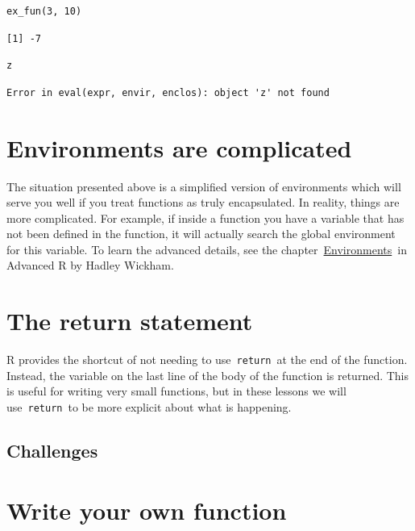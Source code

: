 \documentclass[
]{book}
\begin{document}
\begin{verbatim}
ex_fun(3, 10)
\end{verbatim}

\begin{verbatim}
[1] -7
\end{verbatim}

\begin{verbatim}
z
\end{verbatim}

\begin{verbatim}
Error in eval(expr, envir, enclos): object 'z' not found
\end{verbatim}

\hypertarget{environments-are-complicated}{%
\section{Environments are complicated}\label{environments-are-complicated}}

The situation presented above is a simplified version of environments which will serve you well if you treat functions as truly encapsulated. In reality, things are more complicated. For example, if inside a function you have a variable that has not been defined in the function, it will actually search the global environment for this variable. To learn the advanced details, see the chapter~\href{http://adv-r.had.co.nz/Environments.html}{Environments}~in Advanced R by Hadley Wickham.

\hypertarget{the-return-statement}{%
\section{The return statement}\label{the-return-statement}}

R provides the shortcut of not needing to use~\texttt{return}~at the end of the function. Instead, the variable on the last line of the body of the function is returned. This is useful for writing very small functions, but in these lessons we will use~\texttt{return}~to be more explicit about what is happening.

\hypertarget{challenges}{%
\subsection{Challenges}\label{challenges}}

\hypertarget{write-your-own-function}{%
\section{Write your own function}\label{write-your-own-function}}
\end{document}
